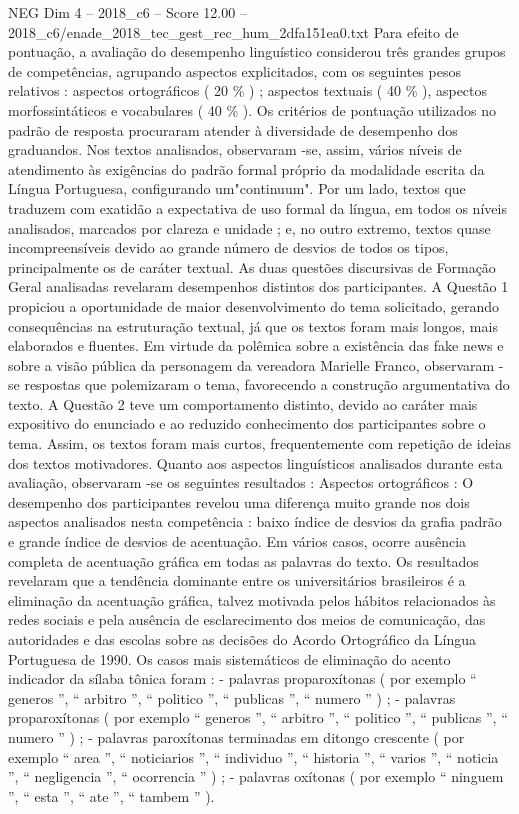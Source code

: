 \begin{textsample}{NEG Dim 4 – 2018\_c6 – Score 12.00 – 2018\_c6/enade\_2018\_tec\_gest\_rec\_hum\_2dfa151ea0.txt}
Para efeito de pontuação, a avaliação do desempenho linguístico considerou três grandes grupos de competências, agrupando aspectos explicitados, com os seguintes pesos relativos : aspectos ortográficos ( 20 \% ) ; aspectos textuais ( 40 \% ), aspectos morfossintáticos e vocabulares ( 40 \% ).
Os critérios de pontuação utilizados no padrão de resposta procuraram atender à diversidade de desempenho dos graduandos.
Nos textos analisados, observaram -se, assim, vários níveis de atendimento às exigências do padrão formal próprio da modalidade escrita da Língua Portuguesa, configurando um"continuum".
Por um lado, textos que traduzem com exatidão a expectativa de uso formal da língua, em todos os níveis analisados, marcados por clareza e unidade ; e, no outro extremo, textos quase incompreensíveis devido ao grande número de desvios de todos os tipos, principalmente os de caráter textual.
As duas questões discursivas de Formação Geral analisadas revelaram desempenhos distintos dos participantes.
A Questão 1 propiciou a oportunidade de maior desenvolvimento do tema solicitado, gerando consequências na estruturação textual, já que os textos foram mais longos, mais elaborados e fluentes.
Em virtude da polêmica sobre a existência das fake news e sobre a visão pública da personagem da vereadora Marielle Franco, observaram -se respostas que polemizaram o tema, favorecendo a construção argumentativa do texto.
A Questão 2 teve um comportamento distinto, devido ao caráter mais expositivo do enunciado e ao reduzido conhecimento dos participantes sobre o tema.
Assim, os textos foram mais curtos, frequentemente com repetição de ideias dos textos motivadores.
Quanto aos aspectos linguísticos analisados durante esta avaliação, observaram -se os seguintes resultados : Aspectos ortográficos : O desempenho dos participantes revelou uma diferença muito grande nos dois aspectos analisados nesta competência : baixo índice de desvios da grafia padrão e grande índice de desvios de acentuação.
Em vários casos, ocorre ausência completa de acentuação gráfica em todas as palavras do texto.
Os resultados revelaram que a tendência dominante entre os universitários brasileiros é a eliminação da acentuação gráfica, talvez motivada pelos hábitos relacionados às redes sociais e pela ausência de esclarecimento dos meios de comunicação, das autoridades e das escolas sobre as decisões do Acordo Ortográfico da Língua Portuguesa de 1990.
Os casos mais sistemáticos de eliminação do acento indicador da sílaba tônica foram : - palavras proparoxítonas ( por exemplo “ generos ”, “ arbitro ”, “ politico ”, “ publicas ”, “ numero ” ) ; - palavras proparoxítonas ( por exemplo “ generos ”, “ arbitro ”, “ politico ”, “ publicas ”, “ numero ” ) ; - palavras paroxítonas terminadas em ditongo crescente ( por exemplo “ area ”, “ noticiarios ”, “ individuo ”, “ historia ”, “ varios ”, “ noticia ”, “ negligencia ”, “ ocorrencia ” ) ; - palavras oxítonas ( por exemplo “ ninguem ”, “ esta ”, “ ate ”, “ tambem ” ).

\end{textsample}
